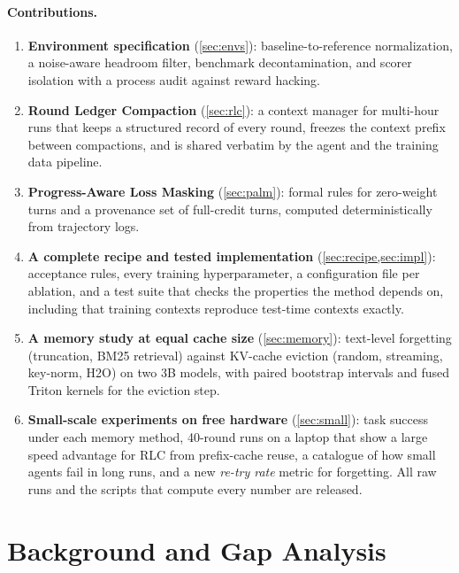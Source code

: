 \documentclass[11pt]{article}
\begin{document}
\paragraph{Contributions.}
\begin{enumerate}
  \item \textbf{Environment specification} (\cref{sec:envs}): baseline-to-reference normalization, a noise-aware headroom filter, benchmark decontamination, and scorer isolation with a process audit against reward hacking.
  \item \textbf{Round Ledger Compaction} (\cref{sec:rlc}): a context manager for multi-hour runs that keeps a structured record of every round, freezes the context prefix between compactions, and is shared verbatim by the agent and the training data pipeline.
  \item \textbf{Progress-Aware Loss Masking} (\cref{sec:palm}): formal rules for zero-weight turns and a provenance set of full-credit turns, computed deterministically from trajectory logs.
  \item \textbf{A complete recipe and tested implementation} (\cref{sec:recipe,sec:impl}): acceptance rules, every training hyperparameter, a configuration file per ablation, and a test suite that checks the properties the method depends on, including that training contexts reproduce test-time contexts exactly.
  \item \textbf{A memory study at equal cache size} (\cref{sec:memory}): text-level forgetting (truncation, BM25 retrieval) against KV-cache eviction (random, streaming, key-norm, H2O) on two 3B models, with paired bootstrap intervals and fused Triton kernels for the eviction step.
  \item \textbf{Small-scale experiments on free hardware} (\cref{sec:small}): task success under each memory method, 40-round runs on a laptop that show a large speed advantage for RLC from prefix-cache reuse, a catalogue of how small agents fail in long runs, and a new \emph{re-try rate} metric for forgetting. All raw runs and the scripts that compute every number are released.
\end{enumerate}


\section{Background and Gap Analysis}
\label{sec:background}
\end{document}
